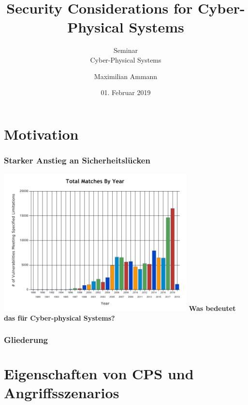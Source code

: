 \documentclass{sikslides}
\title[Security Considerations for CPS]{Security Considerations for Cyber-Physical Systems}
\subtitle{Seminar \\Cyber-Physical Systems} %
\author{Maximilian Ammann}
\date[01.02.2019]{01. Februar 2019}
\begin{document}
    \titleframe

    \section{Motivation}
    \begin{frame}
        \frametitle{Starker Anstieg an Sicherheitslücken}
        \centering
        \includegraphics[trim=0 20px 0 15px,height=7.5cm]{figure/nvd_stats.png}
        \textbf{Was bedeutet das für Cyber-physical Systems?}
    \end{frame}

    \begin{frame}
        \frametitle{Gliederung}
        \tableofcontents[pausesections]
    \end{frame}

    \section{Eigenschaften von CPS und Angriffsszenarios}
\end{document}
